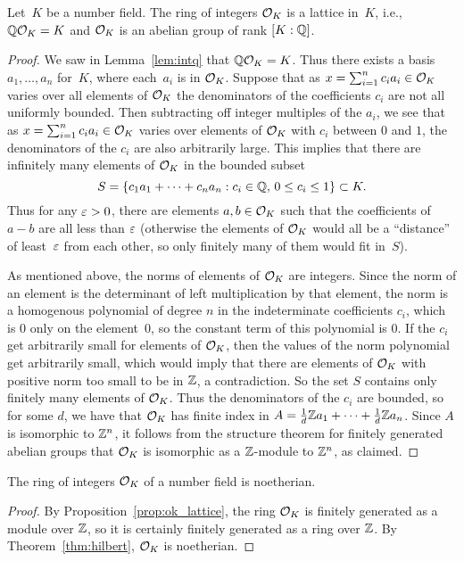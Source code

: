 \begin{proposition}\label{prop:ok_lattice}
	Let~$K$ be a number field.  The ring of integers $\mathcal{O}_K$ is a
	lattice in~$K$, i.e., $\mathbb{Q}\mathcal{O}_K=K$ and $\mathcal{O}_K$ is an abelian group
	of rank $[K:\mathbb{Q}]$.
\end{proposition}
\begin{proof}
	We saw in Lemma~\ref{lem:intq} that $\mathbb{Q}\mathcal{O}_K=K$.  Thus there exists a
	basis $a_1,\ldots, a_n$ for~$K$, where each~$a_i$ is in $\mathcal{O}_K$.
	Suppose that as $x=\sum_{i=1}^n c_i a_i\in \mathcal{O}_K$ varies over all
	elements of $\mathcal{O}_K$ the denominators of the coefficients $c_i$ are not
	all uniformly bounded.  Then subtracting off integer multiples of the
	$a_i$, we see that as $x=\sum_{i=1}^n c_i a_i\in \mathcal{O}_K$ varies over
	elements of $\mathcal{O}_K$ with $c_i$ between $0$ and $1$, the denominators of
	the $c_i$ are also arbitrarily large.  This implies that there are
	infinitely many elements of $\mathcal{O}_K$ in the bounded subset
	$$
		S = \left\{
			c_1 a_1 +\cdots + c_n a_n : c_i \in \mathbb{Q},\, 0\leq c_i \leq 1
		\right\} \subset K.
	$$
	Thus for any $\varepsilon>0$, there are elements $a,b\in \mathcal{O}_K$ such that the
	coefficients of $a-b$ are all less than $\varepsilon$ (otherwise the elements
	of $\mathcal{O}_K$ would all be a ``distance''
	of least~$\varepsilon$ from each other, so only finitely
	many of them would fit in~$S$).
	
	As mentioned above, the norms of elements of $\mathcal{O}_K$ are integers.
	Since the norm of an element is the determinant of left multiplication
	by that element, the norm is a homogenous polynomial of degree $n$ in
	the indeterminate coefficients $c_i$, which is $0$ only on the
	element~$0$, so the constant term of this polynomial is $0$.
	If the $c_i$ get arbitrarily small for elements of
	$\mathcal{O}_K$, then the values of the norm polynomial get arbitrarily small,
	which would imply that there are elements of $\mathcal{O}_K$ with positive norm
	too small to be in $\mathbb{Z}$, a contradiction.  So the set $S$ contains
	only finitely many elements of $\mathcal{O}_K$.  Thus the denominators of the
	$c_i$ are bounded, so for some $d$, we have that $\mathcal{O}_K$ has finite
	index in $A=\frac{1}{d}\mathbb{Z} a_1 + \cdots + \frac{1}{d}\mathbb{Z} a_n$.  Since
	$A$ is isomorphic to $\mathbb{Z}^n$, it follows from the structure theorem for
	finitely generated abelian groups that $\mathcal{O}_K$ is isomorphic as a
	$\mathbb{Z}$-module to $\mathbb{Z}^n$, as claimed.
\end{proof}

\begin{corollary}\label{prop:intnoetherian}
	The ring of integers $\mathcal{O}_K$ of a number field is noetherian.
\end{corollary}
\begin{proof}
	By Proposition~\ref{prop:ok_lattice}, the ring $\mathcal{O}_K$ is
	finitely generated as a module over $\mathbb{Z}$, so it is certainly
	finitely generated as a ring over $\mathbb{Z}$.
	By Theorem~\ref{thm:hilbert}, $\mathcal{O}_K$ is noetherian.
\end{proof}


